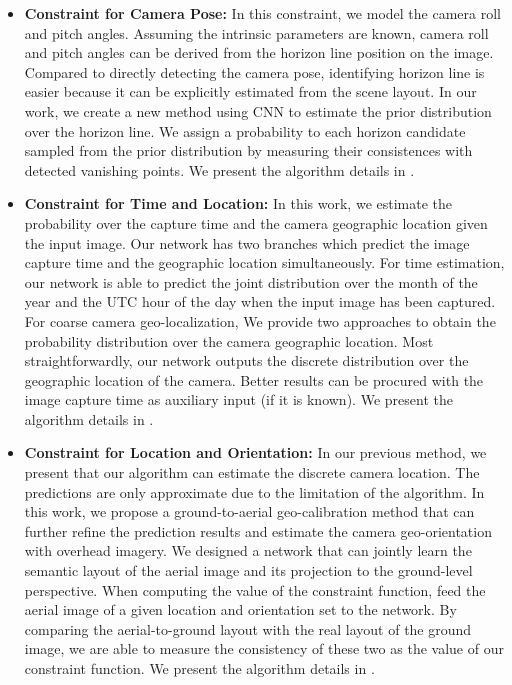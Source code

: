 \begin{itemize}[noitemsep]
  \item \textbf{Constraint for Camera Pose:}
  In this constraint, we model the camera roll and pitch angles.
  Assuming the intrinsic parameters are known, camera roll and pitch
  angles can be derived from the horizon line position on the image.
  Compared to directly detecting the camera pose, identifying horizon
  line is easier because it can be explicitly estimated from the scene
  layout.
  In our work, we create a new method using CNN to estimate the
  prior distribution over the horizon line. We assign a probability to
  each horizon candidate sampled from the prior distribution by
  measuring their consistences with detected vanishing points. We
  present the algorithm details in .  \newline

  \item \textbf{Constraint for Time and Location:}
  In this work, we estimate the probability over the
  capture time and the camera geographic location given the input image.
  Our network has two branches which predict the image
  capture time and the geographic location simultaneously.
  For time estimation, our network is able to predict the
  joint distribution over the month of the year and the UTC hour of the
  day when the input image has been captured.
  For coarse camera geo-localization, We provide two approaches to
  obtain the probability distribution over the camera geographic
  location. Most straightforwardly, our network outputs the discrete
  distribution over the geographic location of the camera. Better
  results can be procured with the image capture time as auxiliary input
  (if it is known).  We present the algorithm details in
  .
  \newline

  \item \textbf{Constraint for Location and Orientation:}
  In our previous method, we present that our algorithm can estimate
  the discrete camera location. The predictions are only approximate
  due to the limitation of the algorithm. In this
  work, we propose a ground-to-aerial geo-calibration method that can
  further refine the prediction results and estimate the
  camera geo-orientation with overhead imagery.
  We designed a network that can jointly learn the semantic layout of
  the aerial image and its projection to the ground-level perspective.
  When computing the value of the constraint function, feed the aerial
  image of a given location and orientation set to the network. 
  By comparing the aerial-to-ground layout with the real layout of the
  ground image, we are able to measure the consistency of these two as
  the value of our constraint function.
  We present the algorithm details in .
  \newline

\end{itemize}



